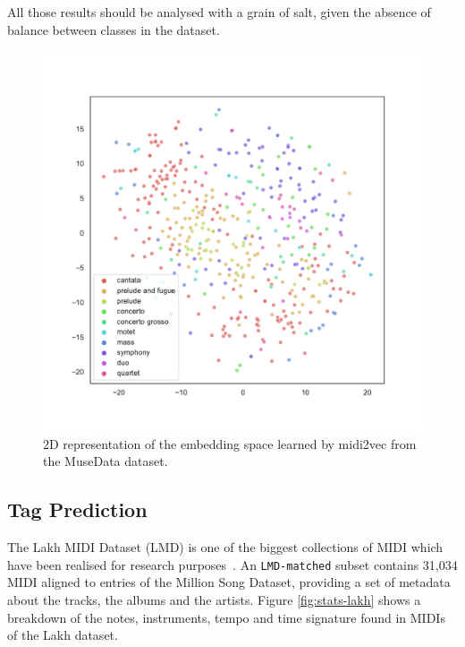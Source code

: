 \documentclass{article}
\begin{document}
All those results should be analysed with a grain of salt, given the absence of balance between classes in the dataset.

\begin{figure}[ht!]
    \centering
    \includegraphics[width=\linewidth]{figs/tsne-musedata-genre.pdf}
    \caption{2D representation of the embedding space learned by midi2vec from the MuseData dataset.}
    \label{fig:tsne-musedata}
\end{figure}

\subsection{Tag Prediction}
The Lakh MIDI Dataset (LMD) is one of the biggest collections of MIDI which have been realised for research purposes~\citep{raffel2016thesis}. An \texttt{LMD-matched} subset contains 31,034 MIDI aligned to entries of the Million Song Dataset, providing a set of metadata about the tracks, the albums and the artists. Figure \ref{fig:stats-lakh} shows a breakdown of the notes, instruments, tempo and time signature found in MIDIs of the Lakh dataset.
\end{document}
